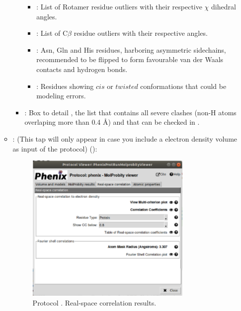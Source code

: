 \begin{itemize}
\begin{itemize}
\begin{itemize}
\begin{itemize}
          \item {}: List of Rotamer residue outliers with their respective $\chi$ dihedral angles.
          \item {}: List of C{$\beta$} residue outliers with their respective angles.
          \item {}: Asn, Gln and His residues, harboring asymmetric sidechains, recommended to be flipped to form favourable van der Waals contacts and hydrogen bonds.
          \item {}: Residues showing $cis$ or $twisted$ conformations that could be modeling errors.
         \end{itemize}

         \item {}: Box to detail , the list that contains all severe clashes (non-H atoms overlaping more than 0.4 \AA) and that can be checked in \coot.
        \end{itemize}
      \item {}: (This tap will only appear in case you include a electron density volume as input of the protocol) ():
       \begin{figure}[H]
         \centering 
         \captionsetup{width=.7\linewidth} 
         \includegraphics[width=0.80\textwidth]{Images_appendix/Fig146.pdf}
         \caption{Protocol . Real-space correlation results.}
         \label{fig:app_protocol_molprobity_4}
        \end{figure}

\end{itemize}
\end{itemize}
